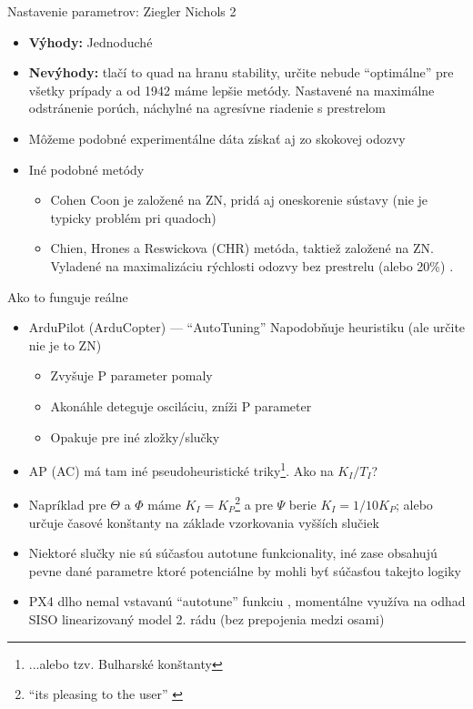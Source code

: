 \begin{frame}[t]{Nastavenie parametrov: Ziegler Nichols 2}
\begin{itemize}
  \item<1-> \textbf{Výhody:} Jednoduché
  \item<2-> \textbf{Nevýhody:} tlačí to quad na hranu stability, určite nebude ``optimálne'' pre všetky prípady a od 1942 máme lepšie metódy. Nastavené na maximálne odstránenie porúch, náchylné na agresívne riadenie s prestrelom \cite{Bequette2010}
     \item<3-> Môžeme podobné experimentálne dáta získať aj zo skokovej odozvy
     \item<4-> Iné podobné metódy
     \begin{itemize}
         \item Cohen Coon je založené na ZN, pridá aj oneskorenie sústavy \citep{Joseph2018} (nie je typicky problém pri quadoch)
        \item Chien, Hrones a Reswickova (CHR) metóda, taktiež založené na ZN. Vyladené na maximalizáciu rýchlosti odozvy bez prestrelu (alebo 20\%) \citep{Hambali2014}.
     \end{itemize}
\end{itemize}
\end{frame}

\begin{frame}[t]{Ako to funguje reálne}
\begin{itemize}
  \item<1-> ArduPilot (ArduCopter) --- ``AutoTuning'' Napodobňuje heuristiku (ale určite nie je to ZN) \citep{AP:LogSeminar}
  \begin{itemize}
  \item Zvyšuje P parameter pomaly
  \item Akonáhle deteguje osciláciu, zníži P parameter
  \item Opakuje pre iné zložky/slučky
\end{itemize}
\item<2-> AP (AC) má tam iné pseudoheuristické triky\footnote{...alebo tzv. Bulharské konštanty}. Ako na $K_I/T_I$?    
\item<3->Napríklad pre $\Theta$ a $\Phi$ máme $K_I=K_P$\footnote{``its pleasing to the user'' \citep{Hall2020}} a pre $\Psi$ berie $K_I=1/10K_P$; alebo určuje časové konštanty na základe vzorkovania vyšších slučiek
\item<4-> Niektoré slučky nie sú súčasťou autotune funkcionality, iné zase obsahujú pevne dané parametre ktoré potenciálne by mohli byť súčasťou takejto logiky \citep{Hall2020}
\item<5-> PX4 dlho nemal vstavanú ``autotune'' funkciu \citep{Bolton2018}, momentálne využíva na odhad SISO linearizovaný model 2. rádu  (bez prepojenia medzi osami) \citep{PX4:PIDTuning}
\end{itemize}
\end{frame}

